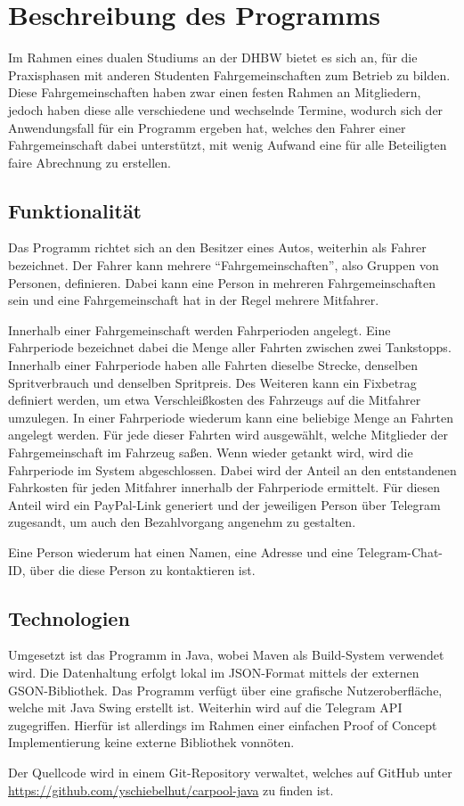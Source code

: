 \chapter{Beschreibung des Programms}
Im Rahmen eines dualen Studiums an der DHBW bietet es sich an, für die Praxisphasen mit anderen Studenten Fahrgemeinschaften zum Betrieb zu bilden.
Diese Fahrgemeinschaften haben zwar einen festen Rahmen an Mitgliedern, jedoch haben diese alle verschiedene und wechselnde Termine, wodurch sich der Anwendungsfall für ein Programm ergeben hat, welches den Fahrer einer Fahrgemeinschaft dabei unterstützt, mit wenig Aufwand eine für alle Beteiligten faire Abrechnung zu erstellen.

\section{Funktionalität}
\label{sec:funktionalität}
Das Programm richtet sich an den Besitzer eines Autos, weiterhin als Fahrer bezeichnet.
Der Fahrer kann mehrere \enquote{Fahrgemeinschaften}, also Gruppen von Personen, definieren.
Dabei kann eine Person in mehreren Fahrgemeinschaften sein und eine Fahrgemeinschaft hat in der Regel mehrere Mitfahrer.

Innerhalb einer Fahrgemeinschaft werden Fahrperioden angelegt.
Eine Fahrperiode bezeichnet dabei die Menge aller Fahrten zwischen zwei Tankstopps.
Innerhalb einer Fahrperiode haben alle Fahrten dieselbe Strecke, denselben Spritverbrauch und denselben Spritpreis.
Des Weiteren kann ein Fixbetrag definiert werden, um etwa Verschleißkosten des Fahrzeugs auf die Mitfahrer umzulegen.
In einer Fahrperiode wiederum kann eine beliebige Menge an Fahrten angelegt werden.
Für jede dieser Fahrten wird ausgewählt, welche Mitglieder der Fahrgemeinschaft im Fahrzeug saßen.
Wenn wieder getankt wird, wird die Fahrperiode im System abgeschlossen.
Dabei wird der Anteil an den entstandenen Fahrkosten für jeden Mitfahrer innerhalb der Fahrperiode ermittelt.
Für diesen Anteil wird ein PayPal-Link generiert und der jeweiligen Person über Telegram zugesandt, um auch den Bezahlvorgang angenehm zu gestalten.

Eine Person wiederum hat einen Namen, eine Adresse und eine Telegram-Chat-ID, über die diese Person zu kontaktieren ist.

\section{Technologien}
Umgesetzt ist das Programm in Java, wobei Maven als Build-System verwendet wird.
Die Datenhaltung erfolgt lokal im JSON-Format mittels der externen GSON-Bibliothek.
Das Programm verfügt über eine grafische Nutzeroberfläche, welche mit Java Swing erstellt ist.
Weiterhin wird auf die Telegram API zugegriffen.
Hierfür ist allerdings im Rahmen einer einfachen Proof of Concept Implementierung keine externe Bibliothek vonnöten.

Der Quellcode wird in einem Git-Repository verwaltet, welches auf GitHub unter \url{https://github.com/yschiebelhut/carpool-java} zu finden ist.